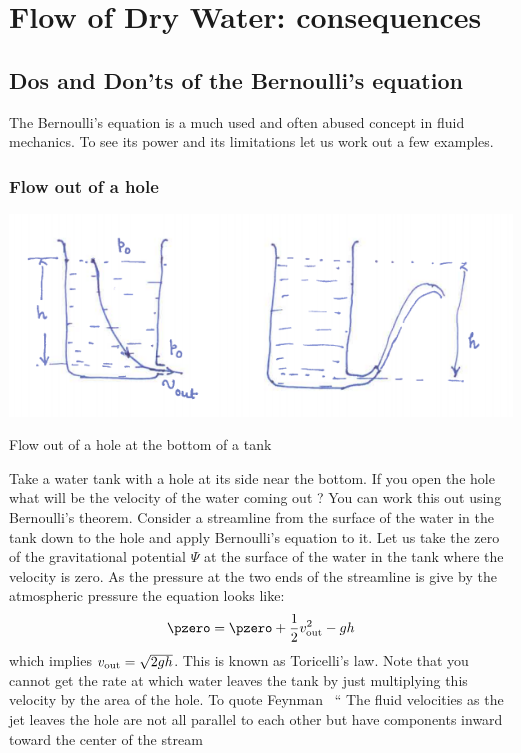 \chapter{Flow of Dry Water: consequences}
\section{Dos and Don'ts of the Bernoulli's equation}
The Bernoulli's equation is a much used and often abused concept in fluid mechanics. 
To see its power and its limitations let us work out a few examples. 
\subsection{Flow out of a hole}
\begin{marginfigure}
\includegraphics{figures/Toricelli.png}
\caption{Flow out of a hole at the bottom of a tank}
\end{marginfigure}
Take a water tank with a hole at its side near the bottom. 
If you open the hole what will be the velocity of the water coming out ?
You can work this out using Bernoulli's theorem. Consider a streamline from
 the surface of the water in the tank down to the hole and apply Bernoulli's equation to it.
Let us take the zero of the gravitational potential $\Psi$ at the surface of the water in the tank
where the velocity is zero.  
As the pressure at the two ends of the streamline is give by the atmospheric pressure the 
equation looks like:
\begin{equation}
\pzero = \pzero + \frac{1}{2}v^2_{\rm out} -  g h 
\end{equation}
which implies $v_{\rm out} = \sqrt{2gh}$. This is known as Toricelli's law. 
Note that you cannot get the rate at which water leaves the tank by just multiplying this velocity 
by the area of the hole. To quote Feynman~\cite{Feynman77}
`` The fluid velocities as the jet leaves the hole are not all parallel to each other but have components inward toward the center of the stream  
